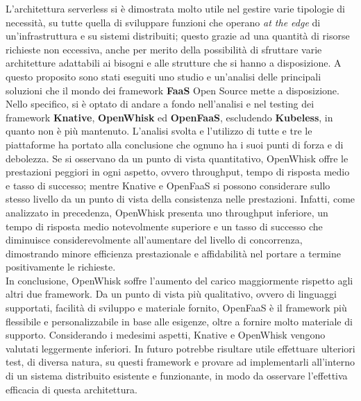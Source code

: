 \documentclass[12pt,a4paper,openany,twoside]{book}
\begin{document}
L'architettura serverless si è dimostrata molto utile nel gestire varie tipologie di necessità, su tutte quella di sviluppare funzioni che operano \textit{at the edge} di un'infrastruttura e su sistemi distribuiti; questo grazie ad una quantità di risorse richieste non eccessiva, anche per merito della possibilità di sfruttare varie architetture adattabili ai bisogni e alle strutture che si hanno a disposizione. A questo proposito sono stati eseguiti uno studio e un'analisi delle principali soluzioni che il mondo dei framework \textbf{\ac{FaaS}} Open Source mette a disposizione.
Nello specifico, si è optato di andare a fondo nell'analisi e nel testing dei framework \textbf{Knative}, \textbf{OpenWhisk} ed \textbf{OpenFaaS}, escludendo \textbf{Kubeless}, in quanto non è più mantenuto. L'analisi svolta e l'utilizzo di tutte e tre le piattaforme ha portato alla conclusione che ognuno ha i suoi punti di forza e di debolezza. Se si osservano da un punto di vista quantitativo, OpenWhisk offre le prestazioni peggiori in ogni aspetto, ovvero throughput, tempo di risposta medio e tasso di successo; mentre Knative e OpenFaaS si possono considerare sullo stesso livello da un punto di vista della consistenza nelle prestazioni. Infatti, come analizzato in precedenza, OpenWhisk presenta uno throughput inferiore, un tempo di risposta medio notevolmente superiore e un tasso di successo che diminuisce considerevolmente all'aumentare del livello di concorrenza, dimostrando minore efficienza prestazionale e affidabilità nel portare a termine positivamente le richieste.\\
In conclusione, OpenWhisk soffre l'aumento del carico maggiormente rispetto agli altri due framework. Da un punto di vista più qualitativo, ovvero di linguaggi supportati, facilità di sviluppo e materiale fornito, OpenFaaS è il framework più flessibile e personalizzabile in base alle esigenze, oltre a fornire molto materiale di supporto. Considerando i medesimi aspetti, Knative e OpenWhisk vengono valutati leggermente inferiori. In futuro potrebbe risultare utile effettuare ulteriori test, di diversa natura, su questi framework e provare ad implementarli all'interno di un sistema distribuito esistente e funzionante, in modo da osservare l'effettiva efficacia di questa architettura.


\backmatter




\end{document}

